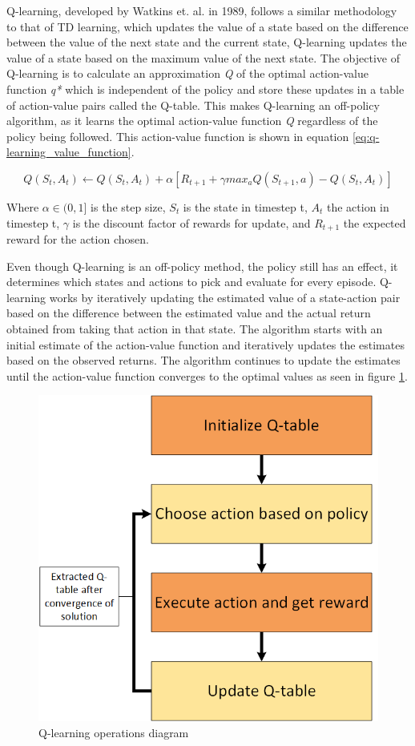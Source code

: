 Q-learning, developed by Watkins et. al. \cite{} in 1989, follows a similar methodology to that of TD learning, which updates the value of a state based on the difference between the value of the next state and the current state, Q-learning updates the value of a state based on the maximum value of the next state. The objective of Q-learning is to calculate an approximation \textit{Q} of the optimal action-value function \textit{q*} which is independent of the policy and store these updates in a table of action-value pairs called the Q-table. This makes Q-learning an off-policy algorithm, as it learns the optimal action-value function \textit{Q} regardless of the policy being followed. This action-value function is shown in equation \ref{eq:q-learning_value_function}.

\begin{equation}
    \label{eq:q-learning_value_function}
    Q(S_t, A_t) \leftarrow Q(S_t, A_t) + \alpha [R_{t+1} + \gamma max_a Q(S_{t+1}, a) - Q(S_t, A_t)]
\end{equation}

Where $\alpha \in (0,1]$ is the step size, $S_t$ is the state in timestep t, $A_t$ the action in timestep t, $\gamma$ is the discount factor of rewards for update, and $R_{t+1}$ the expected reward for the action chosen.

Even though Q-learning is an off-policy method, the policy still has an effect, it determines which states and actions to pick and evaluate for every episode. Q-learning works by iteratively updating the estimated value of a state-action pair based on the difference between the estimated value and the actual return obtained from taking that action in that state. The algorithm starts with an initial estimate of the action-value function and iteratively updates the estimates based on the observed returns. The algorithm continues to update the estimates until the action-value function converges to the optimal values as seen in figure \ref{fig:Q-learning}.

\begin{figure}[!h]
    \centering
    \includegraphics[width=.5\textwidth]{fig/rl/Q-learning.png}
    \caption{Q-learning operations diagram}
    \label{fig:Q-learning}
\end{figure}

